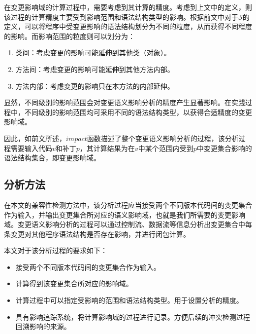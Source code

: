 在变更影响域的计算过程中，需要考虑到其计算的精度。考虑到上文中的定义，则该过程的计算精度主要受到影响范围和语法结构类型的影响。根据前文中对于$\mathcal{S}$的定义，可以将程序中受变更影响的语法结构划分为不同的粒度，从而获得不同程度的影响\cite{petrenko2009variable}。而影响范围的粒度则可以划分为：
\begin{enumerate}
	\item 类间：考虑变更的影响可能延伸到其他类（对象）。
	\item 方法间：考虑变更的影响可能延伸到其他方法内部。
	\item 方法内部：考虑变更的影响只在本方法的内部延伸。
\end{enumerate}

显然，不同级别的影响范围会对变更语义影响分析的精度产生显著影响。在实践过程中，不同级别的影响范围均可采用不同的语法结构类型，以获得合适精度的变更影响域。

因此，如前文所述，$impact$函数描述了整个变更语义影响分析的过程，该分析过程需要输入代码$v$和补丁$p$，其计算结果为在$v$中某个范围内受到$p$中变更集合影响的语法结构集合，即变更影响域。

\subsection{分析方法}

在本文的兼容性检测方法中，该分析过程应当接受两个不同版本代码间的变更集合作为输入，并输出变更集合所对应的语义影响域，也就是我们所需要的变更影响域。变更语义影响分析的过程可以通过控制流、数据流等信息分析出变更集合中每条变更对其他程序语法结构是否存在影响，并进行闭包计算。

本文对于该分析过程的要求如下：
\begin{itemize}
	\item 接受两个不同版本代码间的变更集合作为输入。
	\item 计算得到该变更集合所对应的影响域。
	\item 计算过程中可以指定受影响的范围和语法结构类型。用于设置分析的精度。
	\item 具有影响追踪系统，将计算影响域的过程进行记录。方便后续的冲突检测过程回溯影响的来源。
\end{itemize}

%


